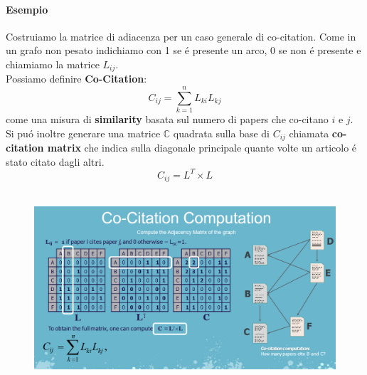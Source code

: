 \paragraph{Esempio} Costruiamo la matrice di adiacenza per un caso generale di co-citation. Come in un grafo non pesato indichiamo con 1 se é presente un arco, 0 se non é presente e chiamiamo la matrice $L_{ij}$. 
\\
Possiamo definire \textbf{Co-Citation}:
\[
C_{ij} = \sum_{k=1}^{n}L_{ki}L_{kj}
\]
come una misura di \textbf{similarity} basata sul numero di papers che co-citano $i$ e $j$. Si puó inoltre generare una matrice $\mathbb{C}$ quadrata sulla base di $C_{ij}$ chiamata \textbf{co-citation matrix} che indica sulla diagonale principale quante volte un articolo é stato citato dagli altri. 
\[
C_{ij} = L^T \times L
\]
\\
\begin{figure}[th]
    \centering
    \includegraphics[scale=0.2]{GraphImportance//img/cocitationmatrix.png}
\end{figure}
\newpage
